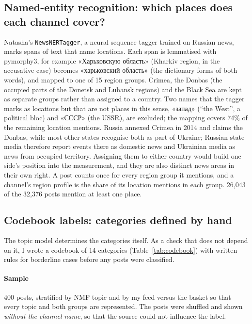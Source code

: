 \documentclass[11pt,a4paper]{article}
\newcommand{\ru}[2]{«#1» (#2)}
\begin{document}
\subsection{Named-entity recognition: which places does each channel cover?}
Natasha's \texttt{NewsNERTagger}, a neural sequence tagger trained on Russian news, marks spans of text that name locations. Each span is lemmatised with pymorphy3, for example \ru{Харьковскую область}{Kharkiv region, in the accusative case} becomes «харьковский область» (the dictionary forms of both words), and mapped to one of 15 region groups. Crimea, the Donbas (the occupied parts of the Donetsk and Luhansk regions) and the Black Sea are kept as separate groups rather than assigned to a country. Two names that the tagger marks as locations but that are not places in this sense, «запад» (``the West'', a political bloc) and «СССР» (the USSR), are excluded; the mapping covers 74\% of the remaining location mentions. Russia annexed Crimea in 2014 and claims the Donbas, while most other states recognise both as part of Ukraine; Russian state media therefore report events there as domestic news and Ukrainian media as news from occupied territory. Assigning them to either country would build one side's position into the measurement, and they are also distinct news areas in their own right. A post counts once for every region group it mentions, and a channel's region profile is the share of its location mentions in each group. 26,043 of the 32,376 posts mention at least one place.

\subsection{Codebook labels: categories defined by hand}
\label{sec:codebook-method}
The topic model determines the categories itself. As a check that does not depend on it, I wrote a codebook of 14 categories (Table~\ref{tab:codebook}) with written rules for borderline cases before any posts were classified.

\paragraph{Sample} 400 posts, stratified by NMF topic and by my feed versus the basket so that every topic and both groups are represented. The posts were shuffled and shown \emph{without the channel name}, so that the source could not influence the label.
\end{document}
